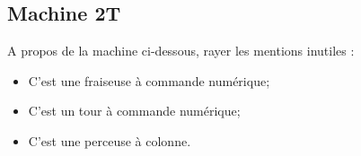 \documentclass[12pt]{article}
\newcounter{exo}
\newenvironment{exo}{\stepcounter{exo}\vspace{0.5cm}{\bfseries Question \theexo\ :}}{\par\vspace{0.5cm}}
\begin{document}








\subsection{Machine 2T}

\begin{exo}\label{exo1} A propos de la machine ci-dessous, rayer les mentions inutiles :
\begin{itemize}
    \item C'est une fraiseuse à commande numérique;
    \item C'est un tour à commande numérique;
    \item C'est une perceuse à colonne.
\end{itemize}
\end{exo}
\end{document}
